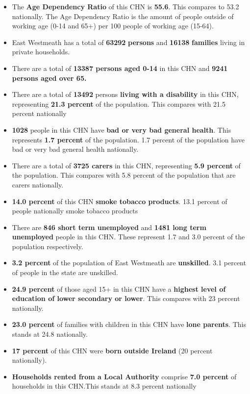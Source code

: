 \documentclass{article}
\begin{document}
\begin{itemize}

\item The \textbf{Age Dependency Ratio} of this CHN is  \textbf{55.6}. This compares to 53.2 nationally. The Age Dependency Ratio is the amount of people outside of working age (0-14 and 65+) per 100 people of working age (15-64). 

\item East Westmeath has a total of \textbf{\num{63292}} \textbf{persons} and  \textbf{\num{16138}} \textbf{families} living in private households.

\item There are a total of \textbf{\num{13387} persons aged 0-14} in this CHN and \textbf{\num{9241} persons aged over 65.} 

\item There are a total of \textbf{\num{13492}} persons \textbf{living with a disability} in this CHN, representing \textbf{21.3 percent} of the population. This compares with  21.5 percent nationally

\item \textbf{\num{1028}} people in this CHN have \textbf{bad or very bad general health}. This represents \textbf{1.7 percent} of the population. 1.7 percent of the population have bad or very bad general health nationally. 

\item There are a total of \textbf{\num{3725} carers} in this CHN, representing \textbf{5.9 percent} of the population. This compares with 5.8 percent of the population that are carers nationally. 

\item \textbf{14.0 percent} of this CHN \textbf{smoke tobacco products}. 13.1 percent of people nationally smoke tobacco products

\item There are \textbf{\num{846} short term unemployed} and \textbf{\num{1481} long term unemployed} people in this CHN. These represent 1.7 and 3.0 percent of the population respectively.

\item  \textbf{3.2 percent} of the population of East Westmeath are \textbf{unskilled}. 3.1 percent of people in the state are unskilled.

\item \textbf{24.9 percent} of those aged 15+ in this CHN have a \textbf{highest level of education of lower secondary or lower}. This compares with 23 percent nationally. 

\item \textbf{23.0 percent} of families with children in this CHN have \textbf{lone parents}. This stands at 24.8 nationally.

\item \textbf{17 percent} of this CHN were \textbf{born outside Ireland} (20 percent nationally).

\item \textbf{Households rented from a Local Authority} comprise \textbf{7.0 percent} of households in this CHN.This stands at 8.3 percent nationally

\end{itemize}
\end{document}
